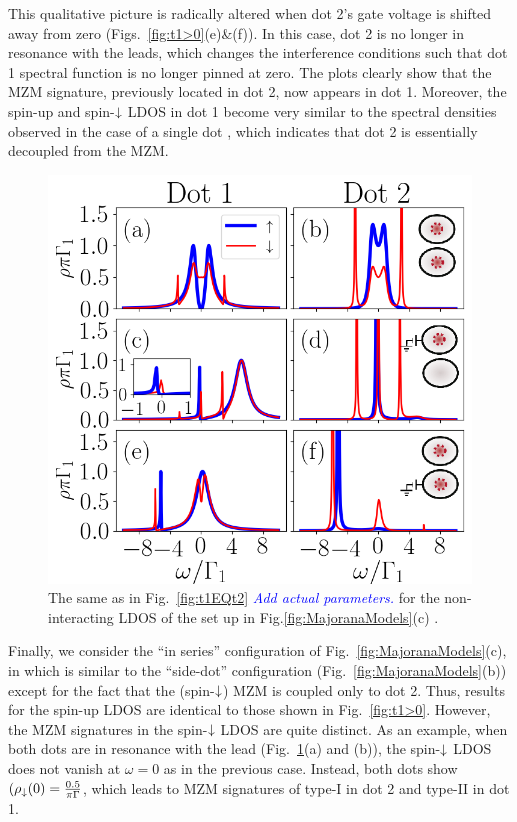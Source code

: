 \documentclass[showpacs,aps,prb,reprint,superscriptaddress]{revtex4-1}
\newcommand{\LUIS}[1]{\textcolor{blue}{\fbox{Luis} {\sl#1}}}
\begin{document}
This qualitative picture is radically altered when dot 2's gate voltage is shifted away from zero (Figs.\ \ref{fig:t1>0}(e)\&(f)). In this case, dot 2 is no longer in resonance with the leads, which changes the interference conditions such that dot 1 spectral function is no longer pinned at zero. The plots clearly show that the MZM signature, previously located in dot 2, now appears in dot 1. Moreover, the spin-up and spin-$\downarrow$ LDOS in dot 1 become very similar to the spectral densities observed in the case of a single dot \cite{liu_detecting_2011,vernek_subtle_2014}, which indicates that dot 2 is essentially decoupled from the MZM. 




\begin{figure}[t]
\begin{center}
\includegraphics[scale=0.48]{Graficos/t2gt0.png}
\caption{  \label{fig:t2>0} The same as in Fig.\ \ref{fig:t1EQt2} \LUIS{Add actual parameters.} for the non-interacting LDOS of the set up in Fig.\ref{fig:MajoranaModels}(c) .
}
%
\end{center}
\end{figure}
     



    Finally, we consider the ``in series'' configuration of  Fig.\ \ref{fig:MajoranaModels}(c), in which is similar to the ``side-dot''  configuration (Fig.\ \ref{fig:MajoranaModels}(b)) except for the fact that the (spin-$\downarrow$) MZM is coupled only to dot 2. Thus, results for the spin-up LDOS are identical to those shown in Fig.\ \ref{fig:t1>0}. However, the MZM signatures in the spin-$\downarrow$ LDOS are quite distinct. As an example, when both dots are in resonance with the lead (Fig.\ \ref{fig:t2>0}(a) and (b)), the spin-$\downarrow$ LDOS does not vanish at $\omega\!=\!0$ as in the previous case. Instead, both dots show $(\rho_\downarrow(0)=\frac{0.5}{\pi \Gamma}$, which leads to MZM signatures of type-I in dot 2 and type-II in dot 1.
    
\end{document}
